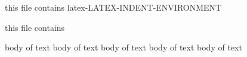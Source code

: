 
this file contains latex-LATEX-INDENT-ENVIRONMENT

this file contains

\begin{myenv}
	body of text
	body of text
	body of text
	body of text
	body of text
\end{myenv}
